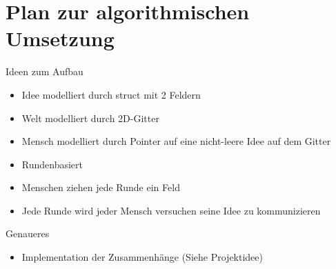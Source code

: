 \section{Plan zur algorithmischen Umsetzung}
\begin{frame}{Ideen zum Aufbau}
	\begin{itemize}[<+->]
		\item Idee modelliert durch struct mit 2 Feldern
		\item Welt modelliert durch 2D-Gitter
		\item Mensch modelliert durch Pointer auf eine nicht-leere Idee auf dem Gitter
		\item Rundenbasiert
		\item Menschen ziehen jede Runde ein Feld
		\item Jede Runde wird jeder Mensch versuchen seine Idee zu kommunizieren
	\end{itemize}		
\end{frame}

\begin{frame}{Genaueres}
	\begin{itemize}[<+->]
		\item Implementation der Zusammenhänge (Siehe Projektidee)
	\end{itemize}
\end{frame}